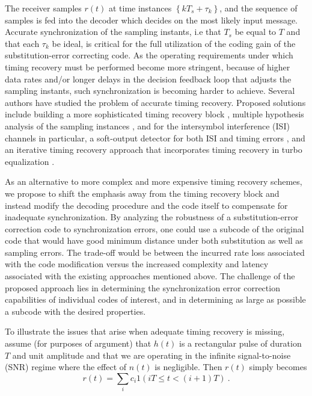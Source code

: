 The receiver samples $r(t)$ at time instances
$\left\{kT_s+\tau_k\right\} $, and the sequence of samples is fed
into the decoder which decides on the most likely input message.
Accurate synchronization of the sampling instants, i.e that $T_s$
be equal to $T$ and that each $\tau_k$ be ideal, is critical for
the full utilization of the coding gain of the substitution-error
correcting code. As the operating requirements under which timing
recovery must be performed become more stringent, because of
higher data rates and/or longer delays in the decision feedback
loop that adjusts the sampling instants, such synchronization is
becoming harder to achieve. Several authors have studied the
problem of accurate timing recovery. Proposed solutions include
building a more sophisticated timing recovery block \cite{liu:02},
multiple hypothesis analysis of the sampling instances
\cite{kbek:04}, and for the intersymbol interference (ISI)
channels in particular, a soft-output detector for both ISI and
timing errors \cite{zhangkavcic:03}, and an iterative timing
recovery approach that incorporates timing recovery in turbo
equalization \cite{iterativetr:04}.

As an alternative to more complex and more expensive timing
recovery schemes, we propose to shift the emphasis away from the
timing recovery block  and instead modify the decoding procedure
and the code itself to compensate for inadequate synchronization.
By analyzing the robustness of a substitution-error correction
code to synchronization errors, one could use a subcode of the
original code that would have good minimum distance
under both substitution as well as
sampling errors. The trade-off would be between the incurred rate
loss associated with the code modification versus the increased
complexity and latency associated with the existing approaches
mentioned above. The challenge of the proposed approach lies in
determining the synchronization error correction capabilities of
individual codes of interest, and in determining as large as
possible a subcode with the desired properties.


To illustrate the issues that arise when adequate timing
recovery is missing, assume (for purposes
of argument) that $h(t)$
is a rectangular
pulse of
duration $T$ and unit amplitude and that
we are
operating in the infinite signal-to-noise (SNR) regime where the
effect of $n(t)$ is negligible. Then $r(t)$ simply becomes
\begin{equation}
r(t)= \sum_{i} c_i 1(iT\leq t < (i+1)T)~.
\end{equation}

